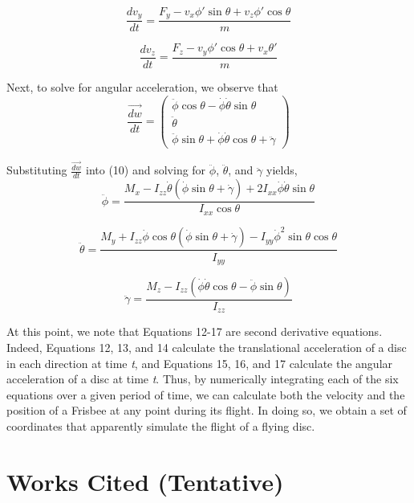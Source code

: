 \documentclass[a4paper,12pt, oneside]{article}
\begin{document}
\begin{equation}
\frac{{dv}_y}{dt}=\frac{F_y-v_x\phi'\sin\theta+v_z\phi'\cos\theta}{m}
\end{equation}

\begin{equation}
\frac{{dv}_z}{dt}=\frac{F_z-v_y\phi'\cos\theta+v_x\theta'}{m}
\end{equation}

Next, to solve for angular acceleration, we observe that 
\begin{equation*}
\frac{\vec{dw}}{dt}=\left(\begin{array}{ccc}\ddot\phi\cos\theta-\dot\phi\dot\theta\sin\theta\\ \ddot\theta \\ \ddot\phi\sin\theta + \dot\phi\dot\theta\cos\theta+\ddot\gamma\end{array} \right)
\end{equation*}

Substituting $\frac{\vec{dw}}{dt}$ into (10) and solving for $\ddot\phi$, $\ddot\theta$, and $\ddot\gamma$ yields,
\begin{equation}
\ddot\phi=\frac{M_x-I_{zz}\dot\theta(\dot\phi\sin\theta+\dot\gamma)+2I_{xx}\dot\phi\dot\theta\sin\theta}{I_{xx}\cos\theta}
\end{equation}

\begin{equation}
\ddot\theta=\frac{M_y+I_{zz}\dot\phi\cos\theta(\dot\phi\sin\theta+\dot\gamma)-I_{yy}\dot\phi^2\sin\theta\cos\theta} {I_{yy}}
\end{equation}

\begin{equation}
\ddot\gamma=\frac{M_z-I_{zz}(\dot\phi\dot\theta\cos\theta-\ddot\phi\sin\theta)}{I_{zz}}
\end{equation}

At this point, we note that Equations 12-17 are second derivative equations. Indeed, Equations 12, 13, and 14 calculate the translational acceleration of a disc in each direction at time \textit{t}, and Equations 15, 16, and 17 calculate the angular acceleration of a disc at time \textit{t}. Thus, by numerically integrating each of the six equations over a given period of time, we can calculate both the velocity and the position of a Frisbee at any point during its flight. In doing so, we obtain a set of coordinates that apparently simulate the flight of a flying disc.

\color{black}
\section{Works Cited (Tentative)}
\end{document}
